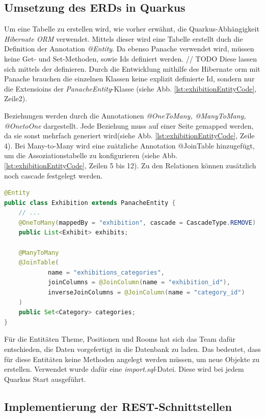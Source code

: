 \subsection{Umsetzung des ERDs in Quarkus}
Um eine Tabelle zu erstellen wird, wie vorher erwähnt, die Quarkus-Abhängigkeit \emph{Hibernate ORM} verwendet.
Mittels dieser wird eine Tabelle erstellt duch die Definition der Annotation \emph{@Entity}.
Da ebenso Panache verwendet wird, müssen keine Get- und Set-Methoden, sowie Ids definiert werden. 
// TODO
Diese lassen sich mittels der  definieren. 
Durch die Entwicklung mithilfe des Hibernate \gls{orm} mit Panache brauchen die einzelnen Klassen keine explizit definierte Id, sondern nur die Extensioins der \emph{PanacheEntity}-Klasse (siehe Abb. \ref{lst:exhibitionEntityCode}, Zeile2). 

Beziehungen werden durch die Annotationen \emph{@OneToMany, @ManyToMany, @OnetoOne} dargestellt. 
Jede Beziehung muss auf einer Seite gemapped werden, da sie sonst mehrfach generiert wird(siehe Abb. \ref{lst:exhibitionEntityCode}, Zeile 4). 
Bei Many-to-Many wird eine zuätzliche Annotation @JoinTable hinzugefügt, um die Assoziationstabelle zu konfigurieren (siehe Abb. \ref{lst:exhibitionEntityCode}, Zeilen 5 bis 12). 
Zu den Relationen können zusätzlich noch \gls{cascade} festgelegt werden. 

\begin{lstlisting}[label=lst:exhibitionEntityCode, language=java]
@Entity
public class Exhibition extends PanacheEntity {
    // ...
    @OneToMany(mappedBy = "exhibition", cascade = CascadeType.REMOVE)
    public List<Exhibit> exhibits;

    @ManyToMany
    @JoinTable(
            name = "exhibitions_categories",
            joinColumns = @JoinColumn(name = "exhibition_id"),
            inverseJoinColumns = @JoinColumn(name = "category_id")
    )
    public Set<Category> categories;
}
\end{lstlisting}

Für die Entitäten Theme, Positionen und Rooms hat sich das Team dafür entschieden, die Daten vorgefertigt in die Datenbank zu laden. 
Das bedeutet, dass für diese Entitäten keine Methoden angelegt werden müssen, um neue Objekte zu erstellen. 
Verwendet wurde dafür eine \emph{import.sql}-Datei. 
Diese wird bei jedem Quarkus Start ausgeführt. 

\subsection{Implementierung der REST-Schnittstellen}


